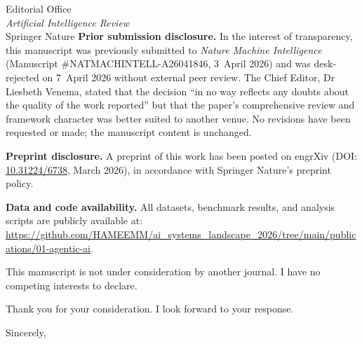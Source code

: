 \documentclass[11pt]{letter}
\begin{document}
\begin{letter}{%
Editorial Office\\
\emph{Artificial Intelligence Review}\\
Springer Nature}
\textbf{Prior submission disclosure.}
In the interest of transparency, this manuscript was previously submitted to \emph{Nature Machine Intelligence} (Manuscript \#NATMACHINTELL-A26041846, 3~April 2026) and was desk-rejected on 7~April 2026 without external peer review. The Chief Editor, Dr Liesbeth Venema, stated that the decision ``in no way reflects any doubts about the quality of the work reported'' but that the paper's comprehensive review and framework character was better suited to another venue. No revisions have been requested or made; the manuscript content is unchanged.

\textbf{Preprint disclosure.}
A preprint of this work has been posted on engrXiv (DOI: \href{https://doi.org/10.31224/6738}{10.31224/6738}, March 2026), in accordance with Springer Nature's preprint policy.

\textbf{Data and code availability.}
All datasets, benchmark results, and analysis scripts are publicly available at:\\ \url{https://github.com/HAMEEMM/ai_systems_landscape_2026/tree/main/publications/01-agentic-ai}.

This manuscript is not under consideration by another journal. I have no competing interests to declare.

Thank you for your consideration. I look forward to your response.

\closing{Sincerely,}

\end{letter}
\end{document}
